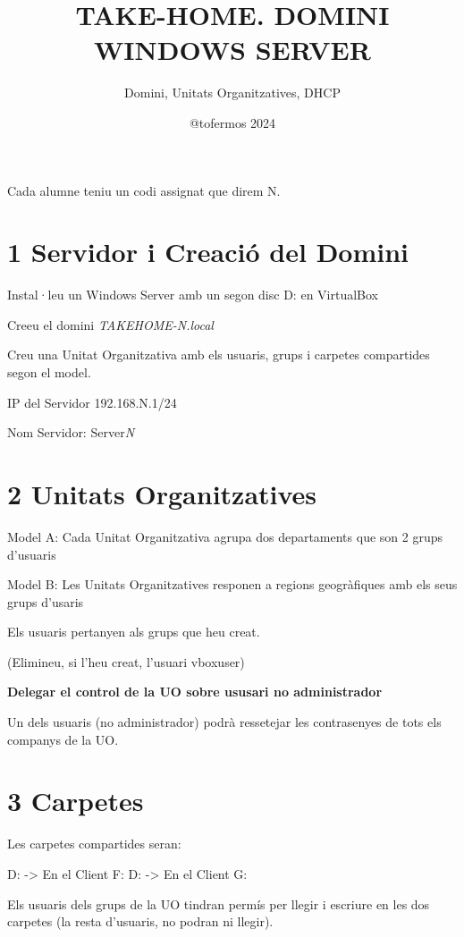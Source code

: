 \documentclass[
  a4paper,
]{article}
\title{TAKE-HOME. DOMINI WINDOWS SERVER}
\subtitle{Domini, Unitats Organitzatives, DHCP}
\author{@tofermos 2024}
\date{}
\begin{document}
\maketitle

{
\setcounter{tocdepth}{2}
\tableofcontents
}
\newpage
\renewcommand\tablename{Tabla}

Cada alumne teniu un codi assignat que direm N.

\section{1 Servidor i Creació del
Domini}\label{servidor-i-creaciuxf3-del-domini}

Instal·leu un Windows Server amb un segon disc D: en VirtualBox

Creeu el domini \emph{TAKEHOME-N.local}

Creu una Unitat Organitzativa amb els usuaris, grups i carpetes
compartides segon el model.

IP del Servidor 192.168.N.1/24

Nom Servidor: Server\emph{N}

\section{2 Unitats Organitzatives}\label{unitats-organitzatives}

Model A: Cada Unitat Organitzativa agrupa dos departaments que son 2
grups d'usuaris

Model B: Les Unitats Organitzatives responen a regions geogràfiques amb
els seus grups d'usaris

Els usuaris pertanyen als grups que heu creat.

(Elimineu, si l'heu creat, l'usuari vboxuser)

\textbf{Delegar el control de la UO sobre ususari no administrador}

Un dels usuaris (no administrador) podrà ressetejar les contrasenyes de
tots els companys de la UO.

\section{3 Carpetes}\label{carpetes}

Les carpetes compartides seran:

D: -\textgreater{} En el Client F: D:
-\textgreater{} En el Client G:

Els usuaris dels grups de la UO tindran permís per llegir i escriure en
les dos carpetes (la resta d'usuaris, no podran ni llegir).
\end{document}
